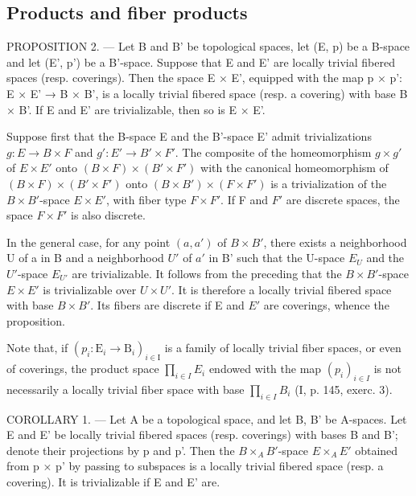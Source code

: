 \subsection{Products and fiber products}

PROPOSITION 2. --- Let B and B' be topological spaces, let (E, p) be a B-space and let (E', p') be a B'-space. Suppose that E and E' are locally trivial fibered spaces (resp. coverings). Then the space E × E', equipped with the map p × p': E × E' → B × B', is a locally trivial fibered space (resp. a covering) with base B × B'. If E and E' are trivializable, then so is E × E'.

Suppose first that the B-space E and the B'-space E' admit trivializations \(g: E \to B \times F\) and \(g': E' \to B' \times F'\). The composite of the homeomorphism \(g \times g'\) of \(E \times E'\) onto \((B \times F) \times (B' \times F')\) with the canonical homeomorphism of \((B \times F) \times (B' \times F')\) onto \((B \times B') \times (F \times F')\) is a trivialization of the \(B \times B'\)-space \(E \times E'\), with fiber type \(F \times F'\). If F and \(F'\) are discrete spaces, the space \(F \times F'\) is also discrete.

In the general case, for any point \((a, a')\) of \(B \times B'\), there exists a neighborhood U of a in B and a neighborhood \(U'\) of \(a'\) in B' such that the U-space \(E_{U}\) and the \(U'\)-space \(E_{U'}\) are trivializable. It follows from the preceding that the \(B \times B'\)-space \(E \times E'\) is trivializable over \(U \times U'\). It is therefore a locally trivial fibered space with base \(B \times B'\). Its fibers are discrete if E and \(E'\) are coverings, whence the proposition.

Note that, if \((p_{i} \colon \mathrm{E}_{i} \to \mathrm{B}_{i})_{i \in \mathrm{I}}\) is a family of locally trivial fiber spaces, or even of coverings, the product space \(\prod_{i \in I} E_{i}\) endowed with the map \((p_{i})_{i \in I}\) is not necessarily a locally trivial fiber space with base \(\prod_{i \in I} B_{i}\) (I, p. 145, exerc. 3).

COROLLARY 1. --- Let A be a topological space, and let B, B' be A-spaces. Let E and E' be locally trivial fibered spaces (resp. coverings) with bases B and B'; denote their projections by p and p'. Then the \(B \times_{A} B'\)-space \(E \times_{A} E'\) obtained from p × p' by passing to subspaces is a locally trivial fibered space (resp. a covering). It is trivializable if E and E' are.

